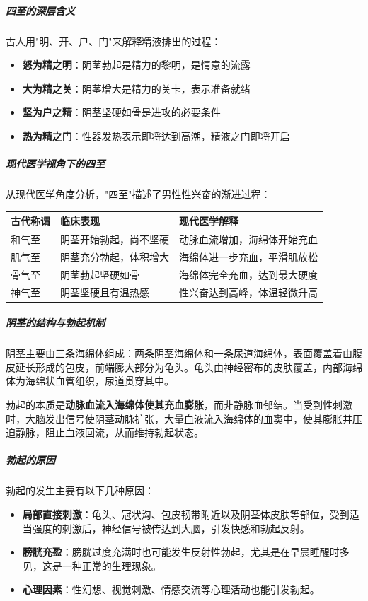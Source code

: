 \subparagraph{四至的深层含义}

古人用"明、开、户、门"来解释精液排出的过程：
\begin{itemize}
    \item \textbf{怒为精之明}：阴茎勃起是精力的黎明，是情意的流露
    \item \textbf{大为精之关}：阴茎增大是精力的关卡，表示准备就绪
    \item \textbf{坚为户之精}：阴茎坚硬如骨是进攻的必要条件
    \item \textbf{热为精之门}：性器发热表示即将达到高潮，精液之门即将开启
\end{itemize}

\subparagraph{现代医学视角下的四至}

从现代医学角度分析，"四至"描述了男性性兴奋的渐进过程：

\begin{center}
\begin{tabular}{p{3cm} p{5cm} p{4cm}}
\toprule
\textbf{古代称谓} & \textbf{临床表现} & \textbf{现代医学解释} \\
\midrule
和气至 & 阴茎开始勃起，尚不坚硬 & 动脉血流增加，海绵体开始充血 \\
肌气至 & 阴茎充分勃起，体积增大 & 海绵体进一步充血，平滑肌放松 \\
骨气至 & 阴茎勃起坚硬如骨 & 海绵体完全充血，达到最大硬度 \\
神气至 & 阴茎坚硬且有温热感 & 性兴奋达到高峰，体温轻微升高 \\
\bottomrule
\end{tabular}
\end{center}

\subparagraph{阴茎的结构与勃起机制}

阴茎主要由三条海绵体组成：两条阴茎海绵体和一条尿道海绵体，表面覆盖着由腹皮延长形成的包皮，前端膨大部分为龟头。龟头由神经密布的皮肤覆盖，内部海绵体为海绵状血管组织，尿道贯穿其中。

勃起的本质是\textbf{动脉血流入海绵体使其充血膨胀}，而非静脉血郁结。当受到性刺激时，大脑发出信号使阴茎动脉扩张，大量血液流入海绵体的血窦中，使其膨胀并压迫静脉，阻止血液回流，从而维持勃起状态。

\subparagraph{勃起的原因}

勃起的发生主要有以下几种原因：
\begin{itemize}
    \item \textbf{局部直接刺激}：龟头、冠状沟、包皮韧带附近以及阴茎体皮肤等部位，受到适当强度的刺激后，神经信号被传达到大脑，引发快感和勃起反射。
    \item \textbf{膀胱充盈}：膀胱过度充满时也可能发生反射性勃起，尤其是在早晨睡醒时多见，这是一种正常的生理现象。
    \item \textbf{心理因素}：性幻想、视觉刺激、情感交流等心理活动也能引发勃起。
\end{itemize}

